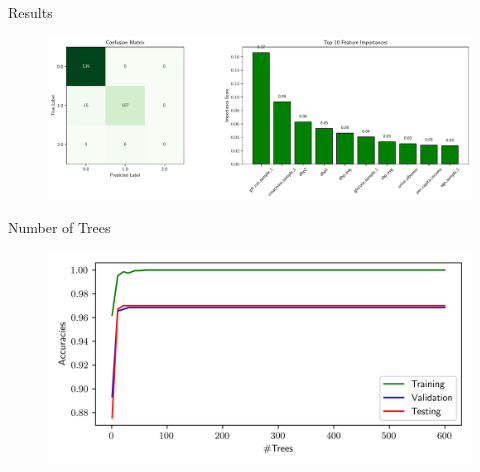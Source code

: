 \documentclass[mathserif]{beamer}
\begin{document}
\begin{frame}{Results}
    \begin{figure}
        \centering
        \includegraphics[scale=.35]{RF_summary.pdf}
    \end{figure}
\end{frame}

\begin{frame}{Number of Trees}
        \begin{figure}
        \centering
        \includegraphics[scale=.5]{RF_acc_tree.png}
    \end{figure}
\end{frame}
\end{document}
